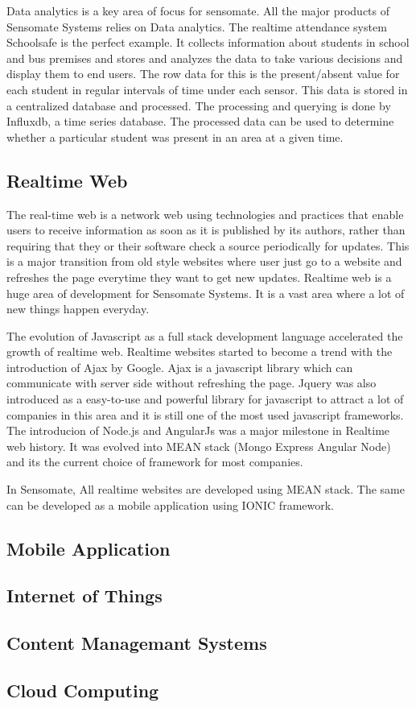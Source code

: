 \documentclass[a4paper,12pt]{report}
\begin{document}
			Data analytics is a key area of focus for sensomate. All the major products of Sensomate Systems relies on Data analytics. The realtime attendance system Schoolsafe is the perfect example. It collects information about students in school and bus premises and stores and analyzes the data to take various decisions and display them to end users. The row data for this is the present/absent value for each student in regular intervals of time under each sensor. This data is stored in a centralized database and processed. The processing and querying is done by Influxdb, a time series database. The processed data can be used to determine whether a particular student was present in an area at a given time.
			\subsection{Realtime Web}
			The real-time web is a network web using technologies and practices that enable users to receive information as soon as it is published by its authors, rather than requiring that they or their software check a source periodically for updates. This is a major transition from old style websites where user just go to a website and refreshes the page everytime they want to get new updates. Realtime web is a huge area of development for Sensomate Systems. It is a vast area where a lot of new things happen everyday.

			The evolution of Javascript as a full stack development language accelerated the growth of realtime web. Realtime websites started to become a trend with the introduction of Ajax by Google. Ajax is a javascript library which can communicate with server side without refreshing the page. Jquery was also introduced as a easy-to-use and powerful library for javascript to attract a lot of companies in this area and it is still one of the most used javascript frameworks. The introducion of Node.js and AngularJs was a major milestone in Realtime web history. It was evolved into MEAN stack (Mongo Express Angular Node) and its the current choice of framework for most companies.

			In Sensomate, All realtime websites are developed using MEAN stack. The same can be developed as a mobile application using IONIC framework.
			\subsection{Mobile Application}
			\subsection{Internet of Things}
			\subsection{Content Managemant Systems}
			\subsection{Cloud Computing}
	
\end{document}
